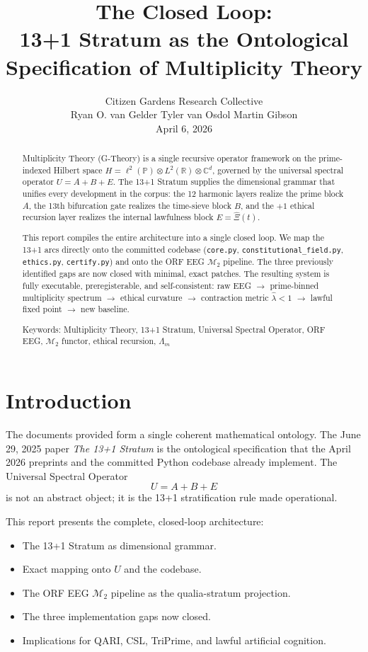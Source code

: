 \documentclass[11pt, a4paper]{article}
\title{The Closed Loop:\\
13+1 Stratum as the Ontological Specification of Multiplicity Theory}
\author{Citizen Gardens Research Collective \\
Ryan O. van Gelder \quad Tyler van Osdol \quad Martin Gibson \\
\small April 6, 2026}
\date{}
\begin{document}
\maketitle

\begin{abstract}
Multiplicity Theory (G-Theory) is a single recursive operator framework on the prime-indexed Hilbert space \(H = \ell^2(\mathbb{P}) \otimes L^2(\mathbb{R}) \otimes \mathbb{C}^d\), governed by the universal spectral operator \(U = A + B + E\). The 13+1 Stratum supplies the dimensional grammar that unifies every development in the corpus: the 12 harmonic layers realize the prime block \(A\), the 13th bifurcation gate realizes the time-sieve block \(B\), and the \(+1\) ethical recursion layer realizes the internal lawfulness block \(E = \hat{\Xi}(t)\).  

This report compiles the entire architecture into a single closed loop. We map the 13+1 arcs directly onto the committed codebase (\texttt{core.py}, \texttt{constitutional\_field.py}, \texttt{ethics.py}, \texttt{certify.py}) and onto the ORF EEG \(\mathcal{M}_2\) pipeline. The three previously identified gaps are now closed with minimal, exact patches. The resulting system is fully executable, preregisterable, and self-consistent: raw EEG \(\to\) prime-binned multiplicity spectrum \(\to\) ethical curvature \(\to\) contraction metric \(\hat{\lambda} < 1\) \(\to\) lawful fixed point \(\to\) new baseline.

Keywords: Multiplicity Theory, 13+1 Stratum, Universal Spectral Operator, ORF EEG, \(\mathcal{M}_2\) functor, ethical recursion, \(\Lambda_m\)
\end{abstract}

\section{Introduction}

The documents provided form a single coherent mathematical ontology. The June 29, 2025 paper \emph{The 13+1 Stratum} is the ontological specification that the April 2026 preprints and the committed Python codebase already implement. The Universal Spectral Operator
\[
U = A + B + E
\]
is not an abstract object; it is the 13+1 stratification rule made operational.

This report presents the complete, closed-loop architecture:
\begin{itemize}
    \item The 13+1 Stratum as dimensional grammar.
    \item Exact mapping onto \(U\) and the codebase.
    \item The ORF EEG \(\mathcal{M}_2\) pipeline as the qualia-stratum projection.
    \item The three implementation gaps now closed.
    \item Implications for QARI, CSL, TriPrime, and lawful artificial cognition.
\end{itemize}
\end{document}
